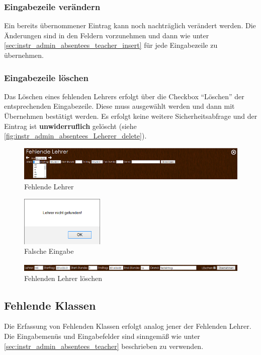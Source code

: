 \subsubsection{Eingabezeile verändern}
Ein bereits übernommener Eintrag kann noch nachträglich verändert werden. Die Änderungen sind in den Feldern vorzunehmen und dann wie unter \autoref{sec:instr_admin_absentees_teacher_insert} für jede Eingabezeile zu übernehmen.
\subsubsection{Eingabezeile löschen}
Das Löschen eines fehlenden Lehrers erfolgt über die Checkbox \enquote{Löschen} der entsprechenden Eingabezeile. Diese muss ausgewählt werden und dann mit Übernehmen bestätigt werden. Es erfolgt keine weitere Sicherheitsabfrage und der Eintrag ist \textbf{unwiderruflich} gelöscht (siehe \autoref{fig:instr_admin_absentees_Leherer_delete}).
\begin{figure}[H]
\centering
\includegraphics[keepaspectratio=true, width=16cm]{images/screenshots/absentees_teacher.png}
\caption{Fehlende Lehrer}
\label{fig:instr_admin_absentees_Lehrer}
\end{figure}
\begin{figure}[H]
\centering
\includegraphics[keepaspectratio=true, width=4cm]{images/screenshots/input_fail_teacher.png}
\caption{Falsche Eingabe}
\label{fig:instr_admin_absentees_fail}
\end{figure}
\begin{figure}[H]
\centering
\includegraphics[keepaspectratio=true, width=16cm]{images/screenshots/absentees_teacher_delete.png}
\caption{Fehlenden Lehrer löschen}
\label{fig:instr_admin_absentees_Leherer_delete}
\end{figure}
\subsection{Fehlende Klassen}
Die Erfassung von Fehlenden Klassen erfolgt analog jener der Fehlenden Lehrer. Die Eingabemenüs und Eingabefelder sind sinngemäß wie unter \autoref{sec:instr_admin_absentees_teacher} beschrieben zu verwenden.
